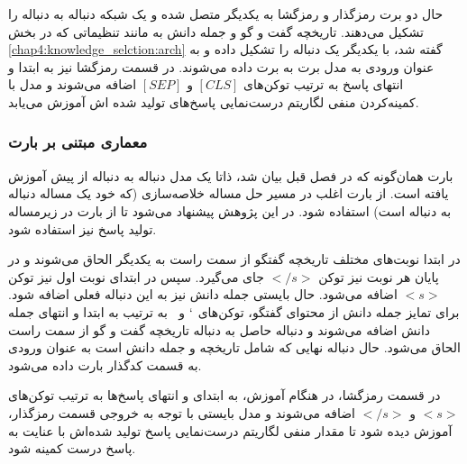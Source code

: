حال دو برت رمزگذار و رمزگشا به یکدیگر متصل شده و یک شبکه دنباله به دنباله را تشکیل می‌دهند. تاریخچه گفت و گو و جمله دانش به مانند تنظیماتی که در 
بخش 
\ref{chap4:knowledge_selction:arch}
گفته شد، با یکدیگر یک دنباله را تشکیل داده و به عنوان ورودی به مدل برت به برت داده می‌شوند. در قسمت رمزگشا نیز به ابتدا و انتهای پاسخ به ترتیب توکن‌های
$[CLS]$
و
$[SEP]$
اضافه می‌شوند و مدل با کمینه‌کردن منفی لگاریتم درست‌نمایی پاسخ‌های تولید شده اش  آموزش می‌یابد.  

\subsubsection{معماری مبتنی بر بارت} \label{chap4:generation:bart}

بارت همان‌گونه که در فصل قبل بیان شد، ذاتا یک مدل دنباله به دنباله از پیش آموزش یافته است. از بارت اغلب در مسیر حل مساله خلاصه‌سازی (که خود یک مساله دنباله به دنباله است) استفاده شود. در این پژوهش پیشنهاد می‌شود تا از بارت در زیرمساله تولید پاسخ نیز استفاده شود. 

در ابتدا نوبت‌های مختلف تاریخچه گفتگو از سمت راست به یکدیگر الحاق می‌شوند و در پایان هر نوبت نیز توکن
$</s>$
جای می‌گیرد. سپس در ابتدای نوبت اول نیز توکن
$<s>$
اضافه می‌شود. حال بایستی جمله دانش نیز به این دنباله فعلی اضافه شود. برای تمایز جمله دانش از محتوای گفتگو، توکن‌های 
$`$
و
$~$
به ترتیب به ابتدا و انتهای جمله دانش اضافه می‌شوند و دنباله حاصل به دنباله تاریخچه گفت و گو از سمت راست الحاق می‌شود. حال دنباله نهایی که شامل تاریخچه و جمله دانش است به عنوان ورودی به قسمت کدگذار بارت داده می‌شود. 

در قسمت رمزگشا، در هنگام آموزش، به ابتدای و انتهای پاسخ‌ها به ترتیب توکن‌های 
$<s>$
و
$</s>$
اضافه می‌شوند و مدل بایستی با توجه به خروجی قسمت رمزگذار، آموزش دیده شود تا مقدار منفی لگاریتم درست‌نمایی پاسخ‌ تولید شده‌اش با عنایت به پاسخ درست کمینه شود.

